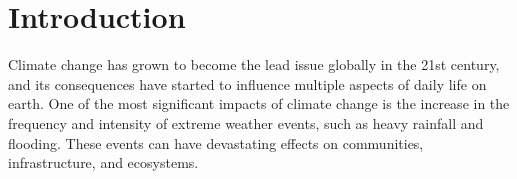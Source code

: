 \section{Introduction}

Climate change has grown to become the lead issue globally in the 21st century, and its consequences have started to influence multiple aspects of daily life on earth. One of the most significant impacts of climate change is the increase in the frequency and intensity of extreme weather events, such as heavy rainfall and flooding. These events can have devastating effects on communities, infrastructure, and ecosystems. 